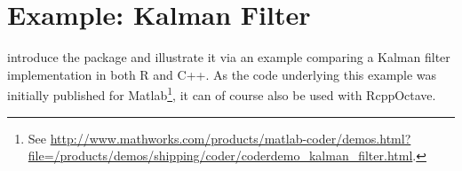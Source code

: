 
\section{Example: Kalman Filter}

\cite{Eddelbuettel+Sanderson:2013} introduce the  package
and illustrate it via an example comparing a Kalman filter implementation in both R and
C++. As the code underlying this example was initially published for
Matlab\footnote{See
  \url{http://www.mathworks.com/products/matlab-coder/demos.html?file=/products/demos/shipping/coder/coderdemo_kalman_filter.html}.},
it can of course also be used with RcppOctave.


